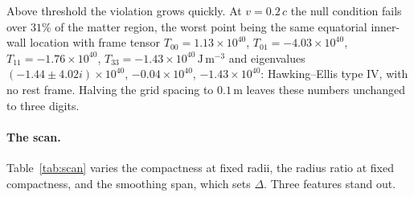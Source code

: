 \documentclass[11pt,a4paper]{article}
\theoremstyle{remark}
\begin{document}
Above threshold the violation grows quickly. At $v = 0.2\,c$ the null condition fails over $31\%$ of the matter region, the worst point being the same equatorial inner-wall location with frame tensor $T_{00} = 1.13\times10^{40}$, $T_{01} = -4.03\times10^{40}$, $T_{11} = -1.76\times10^{40}$, $T_{33} = -1.43\times10^{40}\,\mathrm{J\,m^{-3}}$ and eigenvalues $(-1.44\pm4.02i)\times10^{40}$, $-0.04\times10^{40}$, $-1.43\times10^{40}$: Hawking--Ellis type IV, with no rest frame. Halving the grid spacing to $0.1\,\mathrm{m}$ leaves these numbers unchanged to three digits.

\paragraph{The scan.} Table~\ref{tab:scan} varies the compactness at fixed radii, the radius ratio at fixed compactness, and the smoothing span, which sets $\Delta$. Three features stand out.
\end{document}
